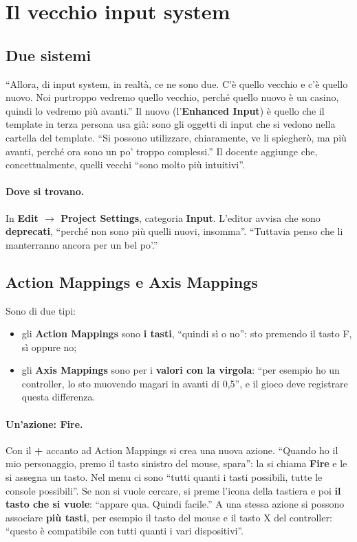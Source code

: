 \section{Il vecchio input system}
\label{gd13:sec:input}

\subsection{Due sistemi}

``Allora, di input system, in realtà, ce ne sono due. C'è quello vecchio e c'è
quello nuovo. Noi purtroppo vedremo quello vecchio, perché quello nuovo è un
casino, quindi lo vedremo più avanti.'' Il nuovo (l'\textbf{Enhanced Input}) è
quello che il template in terza persona usa già: sono gli oggetti di input che
si vedono nella cartella del template. ``Si possono utilizzare, chiaramente, ve
li spiegherò, ma più avanti, perché ora sono un po' troppo complessi.'' Il
docente aggiunge che, concettualmente, quelli vecchi ``sono molto più
intuitivi''.

\paragraph{Dove si trovano.} In \textbf{Edit $\rightarrow$ Project Settings},
categoria \textbf{Input}. L'editor avvisa che sono \textbf{deprecati}, ``perché
non sono più quelli nuovi, insomma''. ``Tuttavia penso che li manterranno ancora
per un bel po'.''

\subsection{Action Mappings e Axis Mappings}

Sono di due tipi:
\begin{itemize}
  \item gli \textbf{Action Mappings} sono \textbf{i tasti}, ``quindi sì o no'':
        sto premendo il tasto F, sì oppure no;
  \item gli \textbf{Axis Mappings} sono per i \textbf{valori con la virgola}:
        ``per esempio ho un controller, lo sto muovendo magari in avanti di
        0,5'', e il gioco deve registrare questa differenza.
\end{itemize}

\paragraph{Un'azione: Fire.} Con il \textbf{+} accanto ad Action Mappings si crea
una nuova azione. ``Quando ho il mio personaggio, premo il tasto sinistro del
mouse, spara'': la si chiama \textbf{Fire} e le si assegna un tasto. Nel menu ci
sono ``tutti quanti i tasti possibili, tutte le console possibili''. Se non si
vuole cercare, si preme l'icona della tastiera e poi \textbf{il tasto che si
vuole}: ``appare qua. Quindi facile.'' A una stessa azione si possono associare
\textbf{più tasti}, per esempio il tasto del mouse e il tasto X del controller:
``questo è compatibile con tutti quanti i vari dispositivi''.

